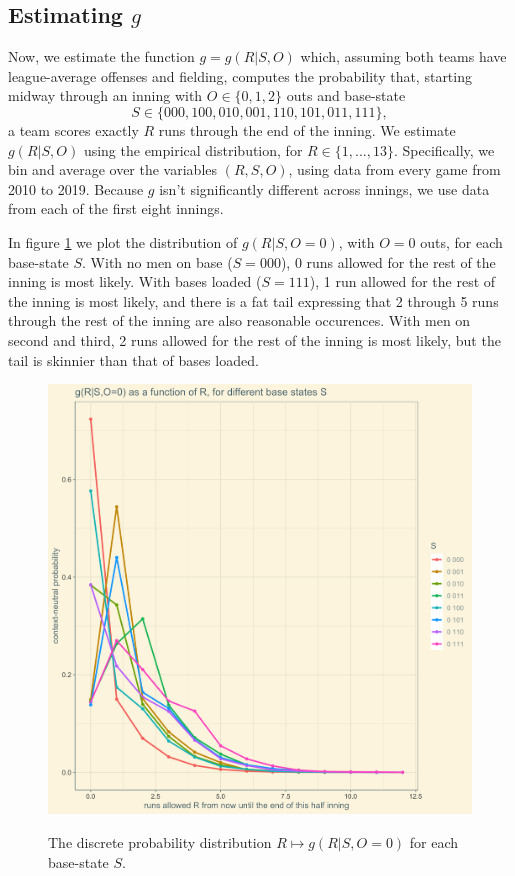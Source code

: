 \documentclass[12pt]{article}
\begin{document}
\subsection{Estimating $g$}

Now, we estimate the function $g=g(R|S,O)$ which, assuming both teams have league-average offenses and fielding, computes the probability that, starting midway through an inning with $O \in \{0,1,2\}$ outs and base-state 
$$S \in \{000,100,010,001,110,101,011,111\},$$
a team scores exactly $R$ runs through the end of the inning. We estimate $g(R|S,O)$ using the empirical distribution, for $R \in \{1,...,13\}$. Specifically, we bin and average over the variables $(R,S,O)$, using data from every game from 2010 to 2019. Because $g$ isn't significantly different across innings, we use data from each of the first eight innings.

In figure \ref{fig:g0} we plot the distribution of $g(R|S,O=0)$, with $O=0$ outs, for each base-state $S$. With no men on base ($S=000$), 0 runs allowed for the rest of the inning is most likely. With bases loaded ($S=111$), 1 run allowed for the rest of the inning is most likely, and there is a fat tail expressing that 2 through 5 runs through the rest of the inning are also reasonable occurences. With men on second and third, 2 runs allowed for the rest of the inning is most likely, but the tail is skinnier than that of bases loaded. 

\begin{figure}[t!]
\centering
\caption{The discrete probability distribution $R \mapsto g(R|S,O=0)$ for each base-state $S$.} 
\includegraphics[width=15cm]{../writeup_plots/plot_gRSO_R0.png}
\label{fig:g0}
\end{figure}
\end{document}
